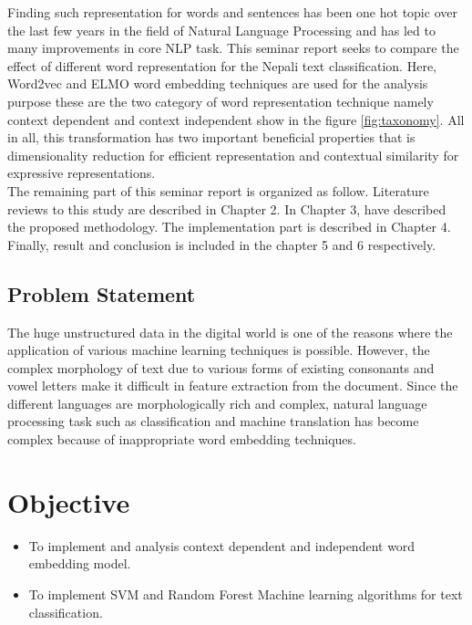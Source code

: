Finding such representation for words and sentences has been one hot topic over the last few years in the field of Natural Language Processing and has led to many improvements in core NLP task.
This seminar report seeks to compare the effect of different word representation for the Nepali text classification. Here, Word2vec and ELMO word embedding techniques are used for the analysis purpose these are the two category of word representation technique namely context dependent and context independent show in the figure \ref{fig:taxonomy}. All in all, this transformation has two important beneficial properties that is dimensionality reduction for efficient representation and contextual similarity for expressive representations.\\
The remaining part of this seminar report is organized as follow. Literature reviews to this study are described in Chapter 2. In Chapter 3, have described the proposed methodology. The implementation part is described in Chapter 4. Finally, result and conclusion is included in the chapter 5 and 6 respectively.
\subsection{Problem Statement}
The huge unstructured data in the digital world is one of the reasons where the application of various machine learning techniques is possible. However, the complex morphology of text due to various forms of existing consonants and vowel letters make it difficult in feature extraction from the document. Since the different languages are morphologically rich and complex, natural language processing task such as classification and machine translation has become complex because of inappropriate word embedding techniques.
\section{Objective}
\begin{itemize}

  \item {To implement and analysis context dependent and independent word embedding model.}

  \item {To implement SVM and Random Forest Machine learning algorithms for text classification.}

\end{itemize}
\clearpage